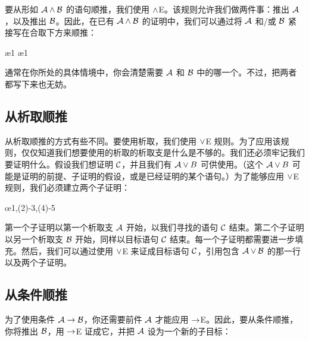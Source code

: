 要从形如 $\mathcal{A} \wedge \mathcal{B}$ 的语句顺推，我们使用 $\wedge$E。该规则允许我们做两件事：推出 $\mathcal{A}$，以及推出 $\mathcal{B}$。因此，在已有 $\mathcal{A} \wedge \mathcal{B}$ 的证明中，我们可以通过将 $\mathcal{A}$ 和/或 $\mathcal{B}$ 紧接写在合取下方来顺推：


\begin{fitchproof}
  \ae{1}
  \ae{1}
\end{fitchproof}


通常在你所处的具体情境中，你会清楚需要 $\mathcal{A}$ 和 $\mathcal{B}$ 中的哪一个。不过，把两者都写下来也无妨。

\subsection*{从析取顺推}

从析取顺推的方式有些不同。要使用析取，我们使用 $\vee$E 规则。为了应用该规则，仅仅知道我们想要使用的析取的析取支是什么是不够的。我们还必须牢记我们要证明什么。假设我们想证明 $\mathcal{C}$，并且我们有 $\mathcal{A} \vee B$ 可供使用。（这个 $\mathcal{A} \vee B$ 可能是证明的前提、子证明的假设，或是已经证明的某个语句。）为了能够应用 $\vee$E 规则，我们必须建立两个子证明：


\begin{fitchproof}
	\open
	\ellipsesline
	\close
	\open
	\ellipsesline
	\close
	\oe{1,(2)-3,(4)-5}
\end{fitchproof}


第一个子证明以第一个析取支 $\mathcal{A}$ 开始，以我们寻找的语句 $\mathcal{C}$ 结束。第二个子证明以另一个析取支 $\mathcal{B}$ 开始，同样以目标语句 $\mathcal{C}$ 结束。每一个子证明都需要进一步填充。然后，我们可以通过使用 $\vee$E 来证成目标语句 $\mathcal{C}$，引用包含 $\mathcal{A} \vee \mathcal{B}$ 的那一行以及两个子证明。

\subsection*{从条件顺推}

为了使用条件 $\mathcal{A} \rightarrow \mathcal{B}$，你还需要前件 $\mathcal{A}$ 才能应用 $\rightarrow$E。因此，要从条件顺推，你将推出 $\mathcal{B}$，用 $\rightarrow$E 证成它，并把 $\mathcal{A}$ 设为一个新的子目标：


\begin{fitchproof}
	\ellipsesline
\end{fitchproof}

